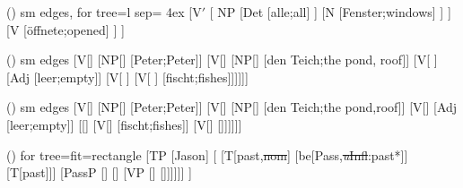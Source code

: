 \begin {forest}()
 sm edges, for tree={l sep= 4ex} [V$'$ [ NP [Det [alle;all] ] [N [Fenster;windows] ] ] [V [öffnete;opened] ] ] \end {forest}
\begin {forest}()
 sm edges [V{[\comps \eliste ]} [NP{[]} [Peter;Peter]] [V{[\comps {}]} [NP{[]} [den Teich;the pond, roof]] [V{[\comps {} ]} [Adj [leer;empty]] [V{[\comps {} ]} [V{[\comps {} ]} [fischt;fishes]]]]]] \end {forest}
\begin {forest}()
 sm edges [V{[\comps \eliste ]} [{NP[]} [Peter;Peter]] [{V[\comps {}]} [{NP[]} [den Teich;the pond,roof]] [{V[\comps {}]} [Adj [leer;empty]] [{[\comps {}]} [{V[\comps {}]} [fischt;fishes]] [{V[\comps {}]} [\trace ]]]]]] \end {forest}
\begin {forest}()
 for tree={fit=rectangle} [TP [Jason] [{\tbar [\st {\textit {u}N*}]} [{T[past,\st {nom}]} [be{[Pass,\st {\textit {u}Infl}:past*]}] [{T[past]}]] [PassP [] [\vP [\textit {v} [\textit {kill}] [{\textit {v}[\st {\textit {u}Infl}:Pass]}]] [VP [] []]]]]] ] \end {forest}

